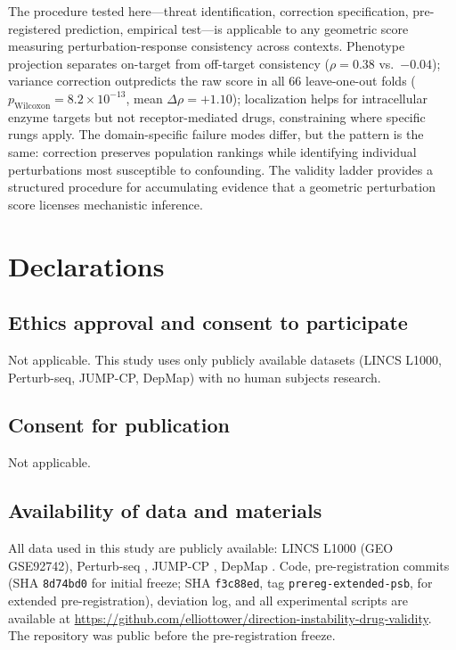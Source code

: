 \documentclass[11pt]{article}
\begin{document}
The procedure tested here---threat identification, correction
specification, pre-registered prediction, empirical test---is applicable
to any geometric score measuring perturbation-response consistency across
contexts. Phenotype projection separates on-target from off-target
consistency ($\rho = 0.38$ vs.\ $-0.04$); variance correction
outpredicts the raw score in all 66 leave-one-out folds
($p_{\text{Wilcoxon}} = 8.2 \times 10^{-13}$, mean
$\Delta\rho = +1.10$); localization helps for intracellular enzyme
targets but not receptor-mediated drugs, constraining where specific
rungs apply. The domain-specific failure modes differ, but the pattern
is the same: correction preserves population rankings while identifying
individual perturbations most susceptible to confounding. The validity
ladder provides a structured procedure for accumulating evidence that
a geometric perturbation score licenses mechanistic inference.

\section*{Declarations}

\subsection*{Ethics approval and consent to participate}
Not applicable. This study uses only publicly available datasets
(LINCS L1000, Perturb-seq, JUMP-CP, DepMap) with no human subjects
research.

\subsection*{Consent for publication}
Not applicable.

\subsection*{Availability of data and materials}
All data used in this study are publicly available: LINCS L1000
(GEO GSE92742), Perturb-seq \citep{replogle2022mapping}, JUMP-CP
\citep{chandrasekaran2023jump}, DepMap \citep{dempster2021chronos}.
Code, pre-registration commits (SHA \texttt{8d74bd0} for initial
freeze; SHA \texttt{f3c88ed}, tag \texttt{prereg-extended-psb}, for
extended pre-registration), deviation log, and all experimental
scripts are available at
\url{https://github.com/elliottower/direction-instability-drug-validity}.
The repository was public before the pre-registration freeze.
\end{document}
